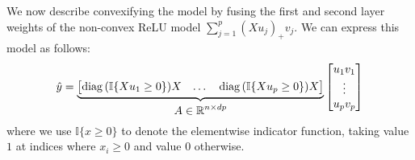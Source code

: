 \documentclass{article} %
\newcommand{\measurement}{y}
\newcommand{\n}{\ensuremath{n}}
\newcommand{\p}{\ensuremath{p}}
\newcommand{\datadim}{\ensuremath{d}}
\newcommand{\X}{\ensuremath{X}}
\DeclareMathOperator{\diag}{diag}
\newcommand{\1}{\ensuremath{{\sf (i)}}}
\newcommand{\2}{\ensuremath{{\sf (ii)}}}
\newcommand{\3}{\ensuremath{{\sf (iii)}}}
\newcommand{\4}{\ensuremath{{\sf (iv)}}}
\newcommand{\5}{\ensuremath{{\sf (v)}}}
\newcommand{\6}{\ensuremath{{\sf (vi)}}}
\newcommand{\R}{\mathbb{R}}
\begin{document}
We now describe convexifying the model by fusing the first and second layer weights of the non-convex ReLU model $\sum_{j=1}^\p (Xu_j)_+v_j$. We can express this model as follows:
\begin{equation}
\label{eq:nonconvexAnotation}
    \hat\measurement = \underbrace{\begin{bmatrix}
        \diag{(\mathbb{I}\{\X u_1\geq 0\})}\X & \dots & \diag{(\mathbb{I}\{\X u_\p\geq 0\})}\X
    \end{bmatrix}}_{\displaystyle\Large A \in \R^{\n \times \datadim\p}} \begin{bmatrix}
        u_1 v_1 \\
        \vdots \\
        u_\p v_\p
    \end{bmatrix}
\end{equation}
where we use $\mathbb{I}\{x\geq 0\}$ to denote the elementwise indicator function, taking value $1$ at indices where $x_i\geq 0$ and value $0$ otherwise. 
\end{document}
